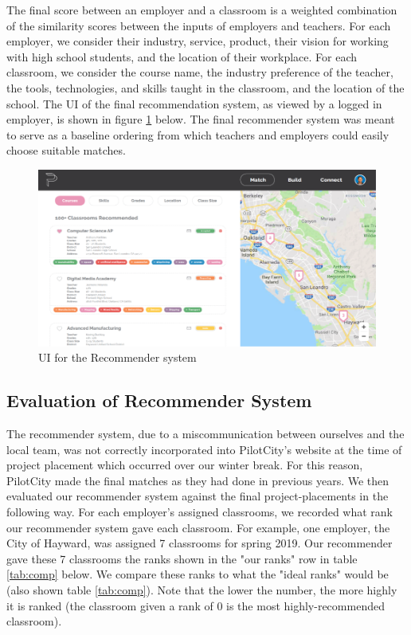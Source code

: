 	The final score between an employer and a classroom is a weighted combination of the similarity scores between the inputs of employers and teachers. For each employer, we consider their industry, service, product, their vision for working with high school students, and the location of their workplace. For each classroom, we consider the course name, the industry preference of the teacher, the tools, technologies, and skills taught in the classroom, and the location of the school. The UI of the final recommendation system, as viewed by a logged in employer, is shown in figure \ref{fig:recommender_system} below. The final recommender system was meant to serve as a baseline ordering from which teachers and employers could easily choose suitable matches. 
	
	\begin{figure}[H]
        \centering
        \includegraphics[scale=0.35]{recommender_ui.png}
        \caption{UI for the Recommender system}
        \label{fig:recommender_system}
    \end{figure}
	
\subsection{Evaluation of Recommender System}

The recommender system, due to a miscommunication between ourselves and the local team, was not correctly incorporated into PilotCity's website at the time of project placement which occurred over our winter break. For this reason, PilotCity made the final matches as they had done in previous years. We then evaluated our recommender system against the final project-placements in the following way. For each employer's assigned classrooms, we recorded what rank our recommender system gave each classroom. For example, one employer, the City of Hayward, was assigned 7 classrooms for spring 2019. Our recommender gave these 7 classrooms the ranks shown in the "our ranks" row in table \ref{tab:comp} below. We compare these ranks to what the "ideal ranks" would be (also shown table \ref{tab:comp}). Note that the lower the number, the more highly it is ranked (the classroom given a rank of 0 is the most highly-recommended classroom).

